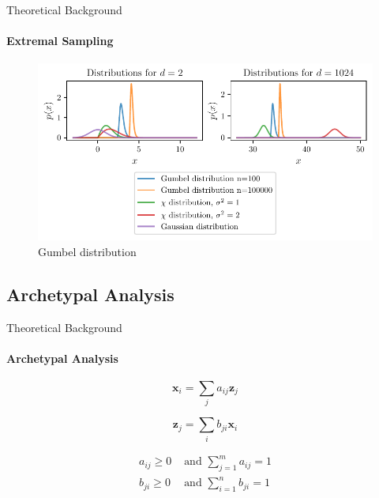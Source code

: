 \documentclass[aspectratio=169]{beamer}
\begin{document}
\begin{frame}{Theoretical Background}
    \framesubtitle{Extremal Sampling}
    
\begin{figure}[htpb]
	\centering
        \includegraphics[height=0.7\textheight]{beamer-figures/samples/gumbel_multi.pdf}
	\caption{Gumbel distribution}%
        \label{fig:gumbel_multi}
\end{figure}
    
\end{frame}

\subsection{Archetypal Analysis}

\begin{frame}{Theoretical Background}
   \framesubtitle{Archetypal Analysis}
\begin{equation}%
    \label{eq:data_from_archetypes}
    \mathbf{x}_i = \sum_j a_{ij} \mathbf{z}_j
\end{equation}

\begin{equation}%
    \label{eq:archetypes_from_data}
    \mathbf{z}_j = \sum_i b_{ji} \mathbf{x}_i
\end{equation}

\begin{equation}
    \begin{aligned}%
        \label{eq:archetype_constraints}
        a_{ij} \geq 0 &\textrm{ and } \sum_{j=1}^{m} a_{ij} = 1 \\
        b_{ji} \geq 0 &\textrm{ and } \sum_{i=1}^{n} b_{ji} = 1
    \end{aligned}   
\end{equation}
\end{frame}
    
\end{document}
